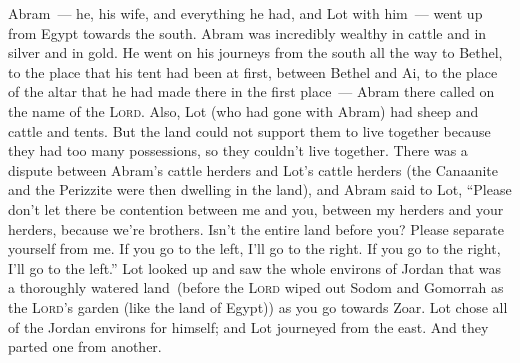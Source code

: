 
\begin{inparaenum}
     Abram~--- he, his wife, and everything he had, and Lot with him~--- went up from Egypt towards the south.%
     Abram was incredibly wealthy in cattle and in silver and in gold.%
     He went on his journeys from the south all the way to Bethel, to the place that his tent had been at first, between Bethel and Ai,%
     to the place of the altar that he had made there in the first place~--- Abram there called on the name of the \textsc{Lord}.%
     Also, Lot (who had gone with Abram) had sheep and cattle and tents.%
     But the land could not support them to live together because they had too many possessions, so they couldn't live together.%
     There was a dispute between Abram's cattle herders and Lot's cattle herders (the Canaanite and the Perizzite were then dwelling in the land),%
     and Abram said to Lot, ``Please don't let there be contention between me and you, between my herders and your herders, because we're brothers.%
     Isn't the entire land before you? Please separate yourself from me. If you go to the left, I'll go to the right. If you go to the right, I'll go to the left.''%
     Lot looked up and saw the whole environs of Jordan that was a thoroughly watered land\understood\ (before the \textsc{Lord} wiped out Sodom and Gomorrah as the \textsc{Lord}'s garden (like the land of Egypt)) as you go towards Zoar.%
     Lot chose all of the Jordan environs for himself; and Lot journeyed from the east. And they parted one from another.%

\end{inparaenum}
